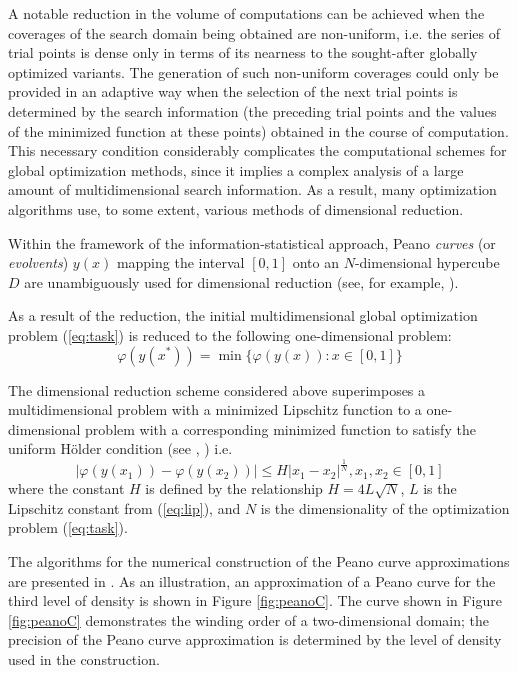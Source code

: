 \documentclass{gOMS2e}
\theoremstyle{plain}%
\theoremstyle{definition}
\theoremstyle{remark}
\begin{document}
A notable reduction in the volume of computations can be achieved when the coverages of the
search domain being obtained are non-uniform, i.e. the series of trial points is dense
only in terms of its nearness to the sought-after globally optimized variants.
The generation of such non-uniform coverages could only be provided in an adaptive
way when the selection of the next trial points is determined by the search information
(the preceding trial points and the values of the minimized function at these points)
obtained in the course of computation. This necessary condition considerably
complicates the computational schemes for global optimization methods, since it
implies a complex analysis of a large amount of multidimensional search information.
As a result, many optimization algorithms use, to some extent, various methods of dimensional reduction.
\par
Within the framework of the information-statistical approach, Peano \textit{curves} (or \textit{evolvents})
\(y(x)\) mapping the interval \([0, 1]\) onto an \(N\)-dimensional hypercube \(D\) are
unambiguously used for dimensional reduction (see, for example, \cite{strSergGO}).
\par
As a result of the reduction, the initial multidimensional global optimization
problem (\ref{eq:task}) is reduced to the following one-dimensional problem:
\begin{equation}
\label{eq:oneDimTask}
\varphi(y(x^*))=\min\{\varphi(y(x)):x\in [0,1]\}
\end{equation}
\par
The dimensional reduction scheme considered above superimposes a multidimensional
problem with a minimized Lipschitz function to a one-dimensional problem with a
corresponding minimized function to satisfy the uniform Hölder condition (see \cite{strongin1978}, \cite{strSergGO}) i.e.
\begin{equation}
\label{eq:holder}
|\varphi(y(x_1))-\varphi(y(x_2))|\leqslant H{|x_1-x_2|}^{\frac{1}{N}},x_1,x_2\in[0,1]
\end{equation}
where the constant \(H\) is defined by the relationship \(H=4L\sqrt{N}\), \(L\) is the
Lipschitz constant from (\ref{eq:lip}), and \(N\) is the dimensionality of the optimization problem (\ref{eq:task}).
\par
The algorithms for the numerical construction of the Peano curve approximations are presented in \cite{strSergGO}.
As an illustration, an approximation of a Peano curve for the third level of density is
shown in Figure \ref{fig:peanoC}. The curve shown in Figure \ref{fig:peanoC} demonstrates the winding order of a
two-dimensional domain; the precision of the Peano curve approximation is determined by the
level of density used in the construction.
\end{document}
